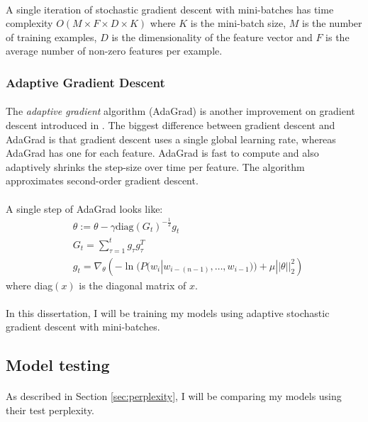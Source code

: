 \paragraph{}
A single iteration of stochastic gradient descent with mini-batches has time complexity $O(M\times F \times D\times K)$ where $K$ is the mini-batch size, $M$ is the number of training examples, $D$ is the dimensionality of the feature vector and $F$ is the average number of non-zero features per example. 

\subsubsection{Adaptive Gradient Descent}
\paragraph{}
The \emph{adaptive gradient} algorithm (AdaGrad) is another improvement on gradient descent introduced in \cite{Duchi2011}. The biggest difference between gradient descent and AdaGrad is that gradient descent uses a single global learning rate, whereas AdaGrad has one for each feature. AdaGrad is fast to compute and also adaptively shrinks the step-size over time per feature. The algorithm approximates second-order gradient descent.
\paragraph{}
A single step of AdaGrad looks like:
\begin{align}
& \theta := \theta - \gamma \mbox{diag}(G_t)^{-\frac{1}{2}} g_t
\\
&G_t = \sum_{\tau=1}^t g_{\tau} g_{\tau}^T \nonumber
\\
& g_t =\nabla_\theta \left( -\ln(P(w_i | w_{i-(n-1)},\dots, w_{i-1})) +  \mu ||\theta||^2_2 \right) \nonumber
\end{align}
where diag$(x)$ is the diagonal matrix of $x$.
\paragraph{}
In this dissertation, I will be training my models using adaptive stochastic gradient descent with mini-batches.

\subsection{Model testing}
\paragraph{}
As described in Section \ref{sec:perplexity}, I will be comparing my models using their test perplexity.
